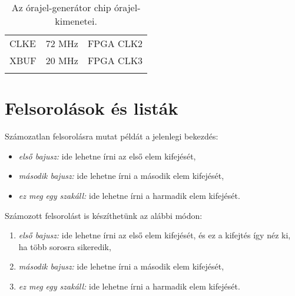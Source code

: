 \documentclass[11pt,magyar,a4paper,oneside,]{report}
\begin{document}
\begin{longtable}[c]{@{}lll@{}}
\\\addlinespace
\begin{minipage}[t]{0.09\columnwidth}\raggedright
CLKE
\end{minipage} & \begin{minipage}[t]{0.14\columnwidth}\raggedright
72 MHz
\end{minipage} & \begin{minipage}[t]{0.16\columnwidth}\raggedright
FPGA CLK2
\end{minipage}
\\\addlinespace
\begin{minipage}[t]{0.09\columnwidth}\raggedright
XBUF
\end{minipage} & \begin{minipage}[t]{0.14\columnwidth}\raggedright
20 MHz
\end{minipage} & \begin{minipage}[t]{0.16\columnwidth}\raggedright
FPGA CLK3
\end{minipage}
\\\addlinespace
\bottomrule
\addlinespace
\caption{Az órajel-generátor chip órajel-kimenetei.}
\end{longtable}

\section{Felsorolások és listák}\label{felsoroluxe1sok-uxe9s-listuxe1k}

Számozatlan felsorolásra mutat példát a jelenlegi bekezdés:

\begin{itemize}
\itemsep1pt\parskip0pt
\item
  \emph{első bajusz:} ide lehetne írni az első elem kifejését,
\item
  \emph{második bajusz:} ide lehetne írni a második elem kifejését,
\item
  \emph{ez meg egy szakáll:} ide lehetne írni a harmadik elem kifejését.
\end{itemize}

Számozott felsorolást is készíthetünk az alábbi módon:

\begin{enumerate}
\def\labelenumi{\arabic{enumi}.}
\itemsep1pt\parskip0pt
\item
  \emph{első bajusz:} ide lehetne írni az első elem kifejését, és ez a
  kifejtés így néz ki, ha több sorosra sikeredik,
\item
  \emph{második bajusz:} ide lehetne írni a második elem kifejését,
\item
  \emph{ez meg egy szakáll:} ide lehetne írni a harmadik elem kifejését.
\end{enumerate}
\end{document}
